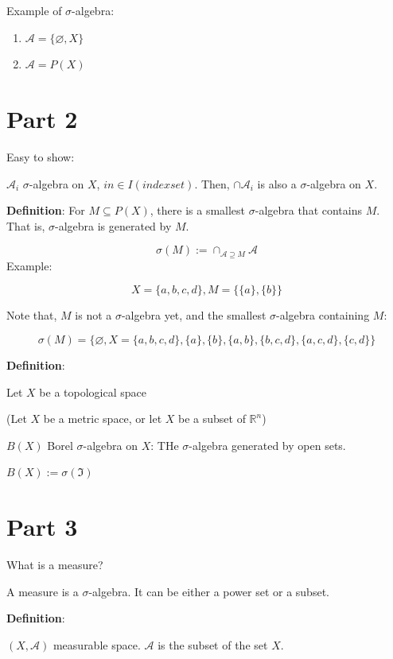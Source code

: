 \documentclass[
]{book}
\begin{document}
Example of \(\sigma\)-algebra:

\begin{enumerate}
\def\labelenumi{(\arabic{enumi})}
\item
  \(\mathcal{A}= \{ \varnothing, X \}\)
\item
  \(\mathcal{A}= P(X)\)
\end{enumerate}

\hypertarget{part-2}{%
\section{Part 2}\label{part-2}}

Easy to show:

\(\mathcal{A}_i\) \(\sigma\)-algebra on \(X\), \(in \in I(index set)\). Then, \(\cap \mathcal{A}_i\) is also a \(\sigma\)-algebra on \(X\).

\textbf{Definition}: For \(M \subseteq P(X)\), there is a smallest \(\sigma\)-algebra that contains \(M\). That is, \(\sigma\)-algebra is generated by \(M\).

\[ \sigma(M):=\cap_{\mathcal{A} \supseteq M}\mathcal{A}\]
Example:

\[X=\{ a, b, c, d\}, M=\{ \{a\}, \{b\}\}\]

Note that, \(M\) is not a \(\sigma\)-algebra yet, and the smallest \(\sigma\)-algebra containing \(M\):

\[\sigma(M)= \{\varnothing, X=\{ a, b, c, d\},\{a\},\{b\},\{a,b\},\{b,c,d\},\{a,c,d\},\{c,d\}\}\]

\textbf{Definition}:

Let \(X\) be a topological space

(Let \(X\) be a metric space, or let \(X\) be a subset of \(\mathbb{R}^n\))

\(B(X)\) Borel \(\sigma\)-algebra on \(X\): THe \(\sigma\)-algebra generated by open sets.

\(B(X):=\sigma(\Im)\)

\hypertarget{part-3}{%
\section{Part 3}\label{part-3}}

What is a measure?

A measure is a \(\sigma\)-algebra. It can be either a power set or a subset.

\textbf{Definition}:

\((X, \mathcal{A})\) measurable space. \(\mathcal{A}\) is the subset of the set \(X\).
\end{document}
